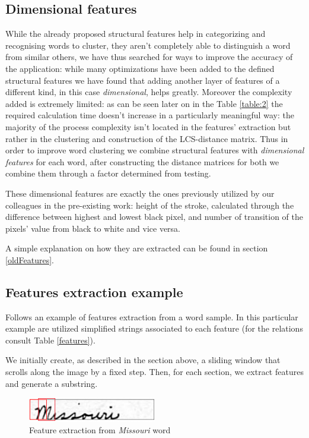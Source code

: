 \subsection{Dimensional features}
While the already proposed structural features help in categorizing and recognising words to cluster, they aren't completely able to distinguish a word from similar others, we have thus searched for ways to improve the accuracy of the application:
while many optimizations have been added to the defined structural features we have found that adding another layer of features of a different kind, in this case \emph{dimensional}, helps greatly.
Moreover the complexity added is extremely limited: as can be seen later on in the Table \ref{table:2} the required calculation time doesn't increase in a particularly meaningful way: the majority of the process complexity isn't located in the features' extraction but rather in the clustering and construction of the LCS-distance matrix.  
Thus in order to improve word clustering we combine structural features with \emph{dimensional features} for each word, after constructing the distance matrices for both we combine them through a factor determined from testing. 

These dimensional features are exactly the ones previously utilized by our colleagues in the pre-existing work: height of the stroke, calculated through the difference between highest and lowest black pixel, and number of transition of the pixels' value from black to white and vice versa.

A simple explanation on how they are extracted can be found in section \ref{oldFeatures}.

\subsection{Features extraction example}
\label{FEE}
Follows an example of features extraction from a word sample.
In this particular example are utilized simplified strings associated to each feature (for the relations consult Table \ref{features}).

We initially create, as described in the section above, a sliding window that scrolls along the image by a fixed step. Then, for each section, we extract features and generate a substring.

\begin{figure}[!htpb]
\centering
\includegraphics[width=0.5\textwidth]{images/missouri_crop.jpg}
\caption{Feature extraction from \emph{Missouri} word}
\end{figure} 

